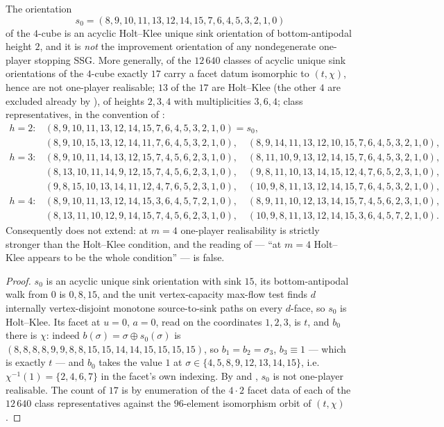 \begin{theorem}[Holt--Klee is not sufficient at $m=4$]\label{hkc:main}
The orientation
\[
  s_0=(8,9,10,11,13,12,14,15,7,6,4,5,3,2,1,0)
\]
of the $4$-cube is an acyclic Holt--Klee unique sink orientation of
bottom-antipodal height $2$, and it is \emph{not} the improvement orientation
of any nondegenerate one-player stopping SSG. More generally, of the $12\,640$
classes of acyclic unique sink orientations of the $4$-cube exactly $17$ carry
a facet datum isomorphic to $(t,\chi)$, hence are not one-player realisable;
$13$ of the $17$ are Holt--Klee (the other $4$ are excluded already by
), of heights $2,3,4$ with multiplicities $3,6,4$;
class representatives, in the convention of :
\[
\begin{array}{ll}
h=2: & (8,9,10,11,13,12,14,15,7,6,4,5,3,2,1,0)=s_0,\\
     & (8,9,10,15,13,12,14,11,7,6,4,5,3,2,1,0),\quad
       (8,9,14,11,13,12,10,15,7,6,4,5,3,2,1,0),\\
h=3: & (8,9,10,11,14,13,12,15,7,4,5,6,2,3,1,0),\quad
       (8,11,10,9,13,12,14,15,7,6,4,5,3,2,1,0),\\
     & (8,13,10,11,14,9,12,15,7,4,5,6,2,3,1,0),\quad
       (9,8,11,10,13,14,15,12,4,7,6,5,2,3,1,0),\\
     & (9,8,15,10,13,14,11,12,4,7,6,5,2,3,1,0),\quad
       (10,9,8,11,13,12,14,15,7,6,4,5,3,2,1,0),\\
h=4: & (8,9,10,11,13,12,14,15,3,6,4,5,7,2,1,0),\quad
       (8,9,11,10,12,13,14,15,7,4,5,6,2,3,1,0),\\
     & (8,13,11,10,12,9,14,15,7,4,5,6,2,3,1,0),\quad
       (10,9,8,11,13,12,14,15,3,6,4,5,7,2,1,0).
\end{array}
\]
Consequently  does not extend: at $m=4$
one-player realisability is strictly stronger than the Holt--Klee condition,
and the reading of  --- ``at $m=4$ Holt--Klee appears to
be the whole condition'' --- is false.
\end{theorem}

\begin{proof}
$s_0$ is an acyclic unique sink orientation with sink $15$, its
bottom-antipodal walk from $0$ is $0,8,15$, and the unit vertex-capacity
max-flow test finds $d$ internally vertex-disjoint monotone source-to-sink
paths on every $d$-face, so $s_0$ is Holt--Klee. Its facet at $u=0$, $a=0$,
read on the coordinates $1,2,3$, is $t$, and $b_0$ there is $\chi$: indeed
$b(\sigma)=\sigma\oplus s_0(\sigma)$ is
$(8,8,8,8,9,9,8,8,15,15,14,14,15,15,15,15)$, so $b_1=b_2=\sigma_3$,
$b_3\equiv1$ --- which is exactly $t$ --- and $b_0$ takes the value $1$ at
$\sigma\in\{4,5,8,9,12,13,14,15\}$, i.e. $\chi^{-1}(1)=\{2,4,6,7\}$ in the
facet's own indexing. By  and , $s_0$ is
not one-player realisable. The count of $17$ is by enumeration of the
$4\cdot2$ facet data of each of the $12\,640$ class representatives against
the $96$-element isomorphism orbit of $(t,\chi)$.
\end{proof}

